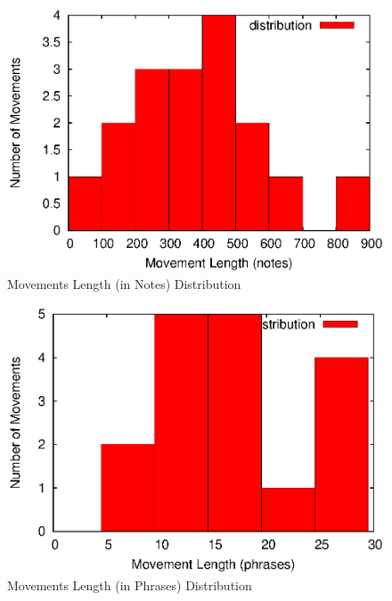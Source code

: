 \begin{figure}[tp]
   \begin{center}
      \includegraphics[width=\textwidth]{fig/notes}

   \end{center}
   \caption{Movements Length (in Notes) Distribution}
   \label{fig:notes}
\end{figure}
\begin{figure}[tp]
   \begin{center}
      \includegraphics[width=\textwidth]{fig/phrases}

   \end{center}
   \caption{Movements Length (in Phrases) Distribution}
   \label{fig:phrases}
\end{figure}

